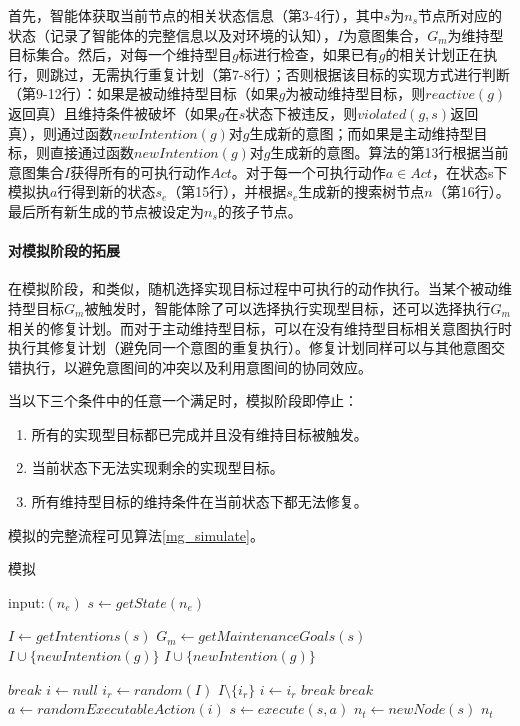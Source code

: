 首先，智能体获取当前节点的相关状态信息（第3-4行），其中$s$为$n_s$节点所对应的状态（记录了智能体的完整信息以及对环境的认知），$I$为意图集合，$G_m$为维持型目标集合。然后，对每一个维持型目$g$标进行检查，如果已有$g$的相关计划正在执行，则跳过，无需执行重复计划（第7-8行）；否则根据该目标的实现方式进行判断（第9-12行）：如果是被动维持型目标（如果$g$为被动维持型目标，则$reactive(g)$返回真）且维持条件被破坏（如果$g$在$s$状态下被违反，则$violated(g,s)$返回真），则通过函数$newIntention(g)$对$g$生成新的意图；而如果是主动维持型目标，则直接通过函数$newIntention(g)$对$g$生成新的意图。算法的第13行根据当前意图集合$I$获得所有的可执行动作$Act$。对于每一个可执行动作$a \in Act$，在状态s下模拟执$a$行得到新的状态$s_e$（第15行），并根据$s_e$生成新的搜索树节点$n$（第16行）。最后所有新生成的节点被设定为$n_s$的孩子节点。

\vspace{1cm}

\paragraph{对模拟阶段的拓展}
在模拟阶段，\SAM 和\SA 类似，随机选择实现目标过程中可执行的动作执行。当某个被动维持型目标$G_m$被触发时，智能体除了可以选择执行实现型目标，还可以选择执行$G_m$相关的修复计划。而对于主动维持型目标，\SAM 可以在没有维持型目标相关意图执行时执行其修复计划（避免同一个意图的重复执行）。修复计划同样可以与其他意图交错执行，以避免意图间的冲突以及利用意图间的协同效应。

当以下三个条件中的任意一个满足时，模拟阶段即停止：
\begin{enumerate}
  \item 所有的实现型目标都已完成并且没有维持目标被触发。
  \item 当前状态下无法实现剩余的实现型目标。
  \item 所有维持型目标的维持条件在当前状态下都无法修复。
\end{enumerate}
模拟的完整流程可见算法\ref{mg_simulate}。

\begin{algorithm}[H]
\caption{模拟}\label{mg_simulate}
\begin{algorithmic}[1]
\STATE input:$(n_e)$
\STATE $s \gets getState(n_e)$

  \STATE $I \gets getIntentions(s)$
  \STATE $G_m \gets getMaintenanceGoals(s)$
      \STATE $I \cup \{newIntention(g)\}$
    \ENDIF
      \STATE $I \cup \{newIntention(g)\}$
    \ENDIF
\ENDFOR

  \STATE $break$
\ENDIF
  \STATE $i \gets null$\label{mg_select_intention}
    \STATE $i_r \gets random(I)$
    \STATE $I \setminus \{i_r\}$
      \STATE $i \gets i_r$
      \STATE $break$
    \ENDIF
  \ENDWHILE
    \STATE $break$
  \ENDIF
  \STATE $a \gets randomExecutableAction(i)$
  \STATE $s \gets execute(s, a)$
\ENDWHILE
\STATE $n_t \gets newNode(s)$
\RETURN $n_t$
\end{algorithmic}
\end{algorithm}

